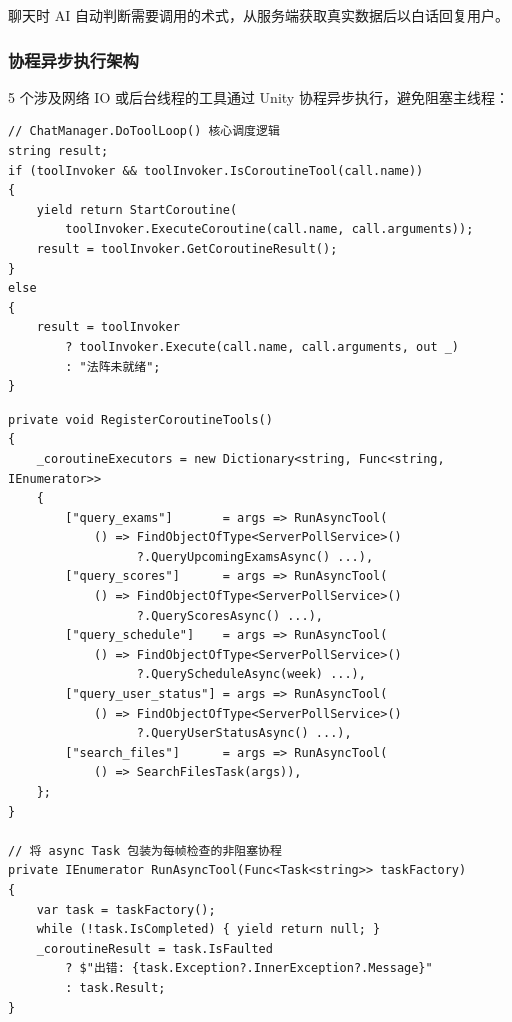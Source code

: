 \documentclass[12pt,a4paper]{ctexart}
\begin{document}
聊天时 AI 自动判断需要调用的术式，从服务端获取真实数据后以白话回复用户。

\subsubsection{协程异步执行架构}

5 个涉及网络 IO 或后台线程的工具通过 Unity 协程异步执行，避免阻塞主线程：

\begin{lstlisting}[style=csharp,caption={ChatManager.DoToolLoop 协程调度},label={lst:coroutine-dispatch}]
// ChatManager.DoToolLoop() 核心调度逻辑
string result;
if (toolInvoker && toolInvoker.IsCoroutineTool(call.name))
{
    yield return StartCoroutine(
        toolInvoker.ExecuteCoroutine(call.name, call.arguments));
    result = toolInvoker.GetCoroutineResult();
}
else
{
    result = toolInvoker
        ? toolInvoker.Execute(call.name, call.arguments, out _)
        : "法阵未就绪";
}
\end{lstlisting}

\begin{lstlisting}[style=csharp,caption={ToolCallInvoker 协程工具注册与 RunAsyncTool},label={lst:coroutine-tools}]
private void RegisterCoroutineTools()
{
    _coroutineExecutors = new Dictionary<string, Func<string, IEnumerator>>
    {
        ["query_exams"]       = args => RunAsyncTool(
            () => FindObjectOfType<ServerPollService>()
                  ?.QueryUpcomingExamsAsync() ...),
        ["query_scores"]      = args => RunAsyncTool(
            () => FindObjectOfType<ServerPollService>()
                  ?.QueryScoresAsync() ...),
        ["query_schedule"]    = args => RunAsyncTool(
            () => FindObjectOfType<ServerPollService>()
                  ?.QueryScheduleAsync(week) ...),
        ["query_user_status"] = args => RunAsyncTool(
            () => FindObjectOfType<ServerPollService>()
                  ?.QueryUserStatusAsync() ...),
        ["search_files"]      = args => RunAsyncTool(
            () => SearchFilesTask(args)),
    };
}

// 将 async Task 包装为每帧检查的非阻塞协程
private IEnumerator RunAsyncTool(Func<Task<string>> taskFactory)
{
    var task = taskFactory();
    while (!task.IsCompleted) { yield return null; }
    _coroutineResult = task.IsFaulted
        ? $"出错: {task.Exception?.InnerException?.Message}"
        : task.Result;
}
\end{lstlisting}
\end{document}
